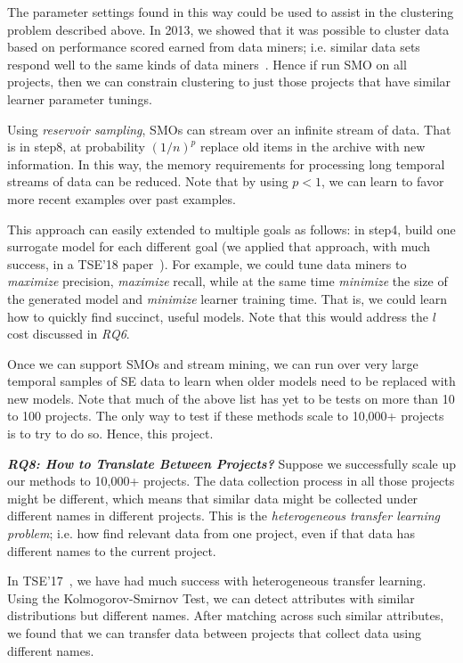 \item
The parameter settings found in this way could be used to assist in the clustering problem described above. In 2013, we showed that it was possible to cluster data based on performance scored earned from data miners; i.e. similar data sets respond well to the same kinds of data miners~\cite{he13}. Hence if run SMO on all projects, then we can constrain clustering to just those projects that have similar learner parameter tunings.
\item
Using {\em reservoir sampling}\cite{Vitter:1985}, 
SMOs can   stream over an infinite stream of data. That is  in step8, at probability $(1/n)^p$ replace old items in the archive
with new information.  In this way, the memory requirements for processing long temporal streams of data can be reduced. Note that
by using $p<1$, we can learn to favor more recent examples over past examples.
\item
This approach can easily extended to multiple goals as follows: in step4, build one surrogate model for each different goal (we applied that approach, with much success, in a TSE'18 paper~\cite{nair18tse}). For example, we could tune data miners to {\em maximize}   precision,
{\em maximize} recall,  while at the same time {\em minimize} the size of the generated model
and {\em minimize} learner training time. That is, we could learn how to quickly find succinct, useful models.
Note that this would address the $l$ cost discussed in {\em RQ6}.
\item
Once we can support SMOs and stream mining, we can run over very large temporal samples of SE data to learn when older models need to be replaced with new models. 
\ei
Note that much of the above list has yet to be tests on more than 10 to 100 projects. The only way to test if these methods scale to 10,000+ projects is to try to do so. Hence, this project.

\textit{\textbf{ RQ8: How to Translate Between Projects?}}
Suppose we successfully scale up our methods to 10,000+ projects. 
The data collection process in all those projects might be different, which
means that similar data might be collected under different
names in different projects. This is the  {\em heterogeneous transfer
learning problem}; i.e. how find relevant data from one project, even if that data has different names to the current
project.

In TSE'17~\cite{nam2017heterogeneous},
we have had much success with heterogeneous transfer learning.
Using the  Kolmogorov-Smirnov Test, we can detect attributes with similar distributions but
different names. After matching across such similar attributes, we found that
we can transfer data between projects that collect data using different names.

